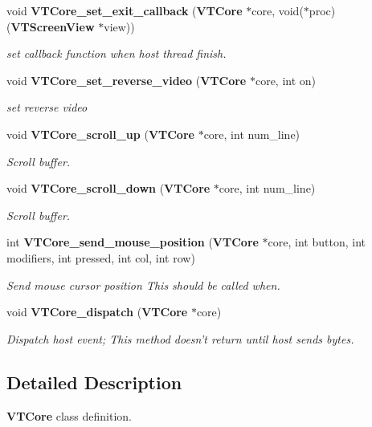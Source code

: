 \begin{CompactItemize}
void {\bf VTCore\_\-set\_\-exit\_\-callback} ({\bf VTCore} $\ast$core, void($\ast$proc)({\bf VTScreen\-View} $\ast$view))
\begin{CompactList}\small\item\em set callback function when host thread finish.\item\end{CompactList}\item 
void {\bf VTCore\_\-set\_\-reverse\_\-video} ({\bf VTCore} $\ast$core, int on)
\begin{CompactList}\small\item\em set reverse video\item\end{CompactList}\item 
void {\bf VTCore\_\-scroll\_\-up} ({\bf VTCore} $\ast$core, int num\_\-line)
\begin{CompactList}\small\item\em Scroll buffer.\item\end{CompactList}\item 
void {\bf VTCore\_\-scroll\_\-down} ({\bf VTCore} $\ast$core, int num\_\-line)
\begin{CompactList}\small\item\em Scroll buffer.\item\end{CompactList}\item 
int {\bf VTCore\_\-send\_\-mouse\_\-position} ({\bf VTCore} $\ast$core, int button, int modifiers, int pressed, int col, int row)
\begin{CompactList}\small\item\em Send mouse cursor position This should be called when.\item\end{CompactList}\item 
void {\bf VTCore\_\-dispatch} ({\bf VTCore} $\ast$core)
\begin{CompactList}\small\item\em Dispatch host event; This method doesn't return until host sends bytes.\item\end{CompactList}\end{CompactItemize}


\subsection{Detailed Description}
{\bf VTCore} class definition.



